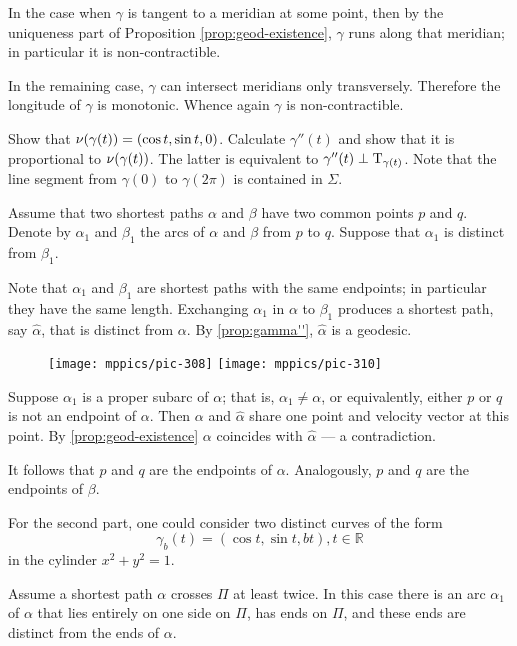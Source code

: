 In the case when $\gamma$ is tangent to a meridian at some point, then by the  uniqueness part of Proposition \ref{prop:geod-existence},
 $\gamma$ runs along that meridian; in particular it is non-contractible.

In the remaining case, $\gamma$ can intersect meridians only transversely.
Therefore the longitude of $\gamma$ is monotonic.
Whence again $\gamma$ is non-contractible.


Show that $\nu(\gamma(t))=(\cos t,\sin t, 0)$.
Calculate $\gamma''(t)$ and show that it is proportional to $\nu(\gamma(t))$.
The latter is equivalent to $\gamma''(t)\perp\mathrm{T}_{\gamma(t)}$. 
Note that the line segment from $\gamma (0) $ to $\gamma (2 \pi) $ is contained in $\Sigma$.



Assume that two shortest paths $\alpha$ and $\beta$ have two common points $p$ and $q$.
Denote by $\alpha_1$ and $\beta_1$ the arcs of
$\alpha$ and $\beta$ from $p$ to $q$.
Suppose that $\alpha_1$ is distinct from $\beta_1$.

Note that $\alpha_1$ and $\beta_1$ are shortest paths with the same endpoints;
in particular they have the same length.
Exchanging $\alpha_1$ in $\alpha$ to $\beta_1$ produces a shortest path, say $\hat\alpha$, that is distinct from $\alpha$.
By \ref{prop:gamma''}, $\hat\alpha$ is a geodesic.

\begin{wrapfigure}[11]{r}{38 mm}
\vskip-5mm
\centering
\texttt{[image: mppics/pic-308]}
\bigskip
\texttt{[image: mppics/pic-310]}
\vskip0mm
\end{wrapfigure}

Suppose $\alpha_1$ is a proper subarc of $\alpha$;
that is, $\alpha_1\ne\alpha$, or equivalently, either $p$ or $q$ is not an endpoint of $\alpha$.
Then $\alpha$ and $\hat\alpha$ share one point and velocity vector at this point.
By \ref{prop:geod-existence} $\alpha$ coincides with $\hat\alpha$ --- a contradiction.

It follows that $p$ and $q$ are the endpoints of $\alpha$. Analogously,  $p$ and $q$ are the endpoints of $\beta$.

For the second part, one could consider two distinct curves of the form 
\[ \gamma_b(t) = ( \cos t , \sin t , bt  )  , t \in \mathbb{R}  \]
in the cylinder $x^2 + y^2 =1$.

Assume a shortest path $\alpha$ crosses $\Pi$ at least twice.
In this case there is an arc $\alpha_1$ of $\alpha$ that lies entirely on one side
 on $\Pi$,  has ends on $\Pi$, and these ends are distinct from the ends of $\alpha$.

